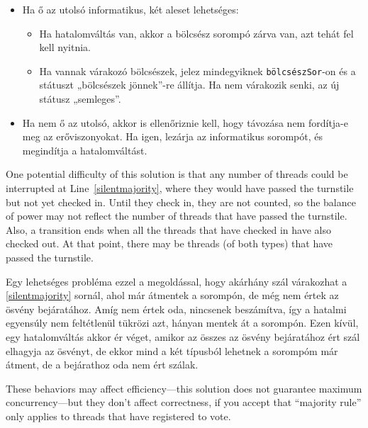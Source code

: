\documentclass{book}
\begin{document}
\begin{itemize}

\item Ha ő az utolsó informatikus, két aleset lehetséges:

    \begin{itemize}

    \item Ha hatalomváltás van, akkor a bölcsész sorompó zárva
       van, azt tehát fel kell nyitnia.

    \item Ha vannak várakozó bölcsészek, jelez mindegyiknek {\tt bölcsészSor}-on
      és a státuszt „bölcsészek jönnek”-re állítja. Ha nem várakozik
      senki, az új státusz „semleges”.

    \end{itemize}  

\item Ha nem ő az utolsó, akkor is ellenőriznie kell, hogy távozása
nem fordítja-e meg az erőviszonyokat. Ha igen, lezárja az
informatikus sorompót, és megindítja a hatalomváltást.

\end{itemize}

One potential difficulty of this solution is that any number
of threads could be interrupted at Line~\ref{silentmajority},
where they would have passed the turnstile but not yet checked in.
Until they check in, they are not counted, so the balance of
power may not reflect the number of threads that have passed the
turnstile.  Also, a transition ends when all the threads that have
checked in have also checked out.  At that point, there may
be threads (of both types) that have passed the turnstile.

Egy lehetséges probléma ezzel a megoldással, hogy akárhány
szál várakozhat a \ref{silentmajority} sornál, ahol
már átmentek a sorompón, de még nem értek az ösvény bejáratához.
Amíg nem értek oda, nincsenek beszámítva, így a hatalmi egyensúly
nem feltétlenül tükrözi azt, hányan mentek át a sorompón.
Ezen kívül, egy hatalomváltás akkor ér véget, amikor
az összes az ösvény bejáratához ért szál elhagyja az
ösvényt, de ekkor mind a két típusból lehetnek
a sorompóm már átment, de a bejárathoz oda nem ért
szálak.

These behaviors may affect efficiency---this solution does
not guarantee maximum concurrency---but they don't affect
correctness, if you accept that ``majority rule'' only applies
to threads that have registered to vote.
\end{document}
